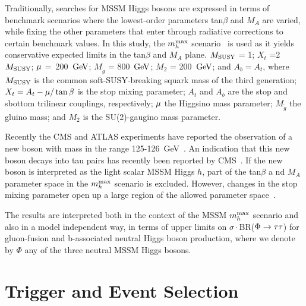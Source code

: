 Traditionally, searches for MSSM Higgs bosons are expressed in terms of benchmark scenarios where 
the lowest-order parameters tan$\beta$ and $M_A$ are varied, while fixing the other parameters that 
enter through radiative corrections to certain benchmark values. 
In this study, the $m_{h}^{\rm max}$ scenario~\cite{MHMAX-Carena,MHMAX-Carena-2002} is used as it 
yields conservative expected limits in the tan$\beta$ and $M_A$ plane. 
$M_{\rm SUSY}$ = 1\TeV; $X_t$ =2$M_{\rm SUSY}$; $\mathrm{\mu}$ =~200~$\mathrm{GeV}$; $M_{\tilde{g}}$ = 800~$\mathrm{GeV}$; 
$M_2$ = 200~$\mathrm{GeV}$; and $A_b = A_t$, where $M_{\rm SUSY}$ is the common soft-SUSY-breaking squark 
mass of the third generation; $X_t = A_t - \mathrm{\mu}/\tan\beta$ is the stop mixing parameter; $A_t$ 
and $A_b$ are the stop and sbottom trilinear couplings, respectively; $\mathrm{\mu}$ the Higgsino mass 
parameter; $M_{\tilde{g}}$ the gluino mass; and $M_2$ is the SU(2)-gaugino mass parameter. 

Recently the CMS and ATLAS experiments have reported the observation of a new boson with mass 
in the range 125-126~GeV~\cite{CMS-HIGGS-DISCOVERY,ATLAS-HIGGS-DISCOVERY}. 
An indication that this new boson decays into tau pairs has recently been reported by 
CMS~\cite{CMS-PAPER-HIG-13-004}.
If the new boson is interpreted as the light scalar MSSM Higgs $h$, part of the tan$\beta$ a
nd $M_A$ parameter space in the $m_{h}^{\rm max}$ scenario is excluded. 
However, changes in the stop mixing parameter open up a large region of the allowed parameter 
space~\cite{Heinemeyer:2011aa,Carena:2013qia}. 

The results are interpreted both in the context of the MSSM $m_{h}^{\rm max}$ scenario and also in a model independent way, 
in terms of upper limits on $\sigma\cdot$BR($\Phi\to\mathrm{\tau}\mathrm{\tau}$) for gluon-fusion and b-associated neutral Higgs boson production,
where we denote by $\Phi$ any of the three neutral MSSM Higgs bosons.




 

\section{Trigger and Event Selection}


